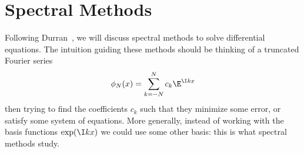 \chapter{Spectral Methods}

Following Durran~\cite{durran2010numerical}, we will discuss spectral
methods to solve differential equations. The intuition guiding these
methods should be thinking of a truncated Fourier series
\begin{equation}
  \phi_{N}(x) = \sum^{N}_{k=-N}c_{k}\E^{\I kx}
\end{equation}
then trying to find the coefficients $c_{k}$ such that they minimize
some error, or satisfy some system of equations. More generally, instead
of working with the basis functions $\exp(\I kx)$ we could use some
other basis: this is what spectral methods study.
